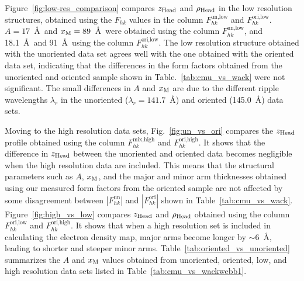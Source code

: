 Figure~\ref{fig:low-res_comparison} compares $z_\text{Head}$ and $\rho_\text{Head}$ in the low resolution structures, 
obtained using the $F_{hk}$ values in the column $F_{hk}^\text{un,low}$ and $F_{hk}^\text{ori,low}$.
$A=17$~\AA\ and $x_\textrm{M}=89$~\AA\ were obtained using the column $F_{hk}^\text{un,low}$, 
and 18.1~\AA\ and 91~\AA\ using the column $F_{hk}^\text{ori,low}$.
The low resolution structure obtained with the unoriented data set agrees well with 
the one obtained with the oriented data set, indicating that the differences in the form factors obtained
from the unoriented and oriented sample shown in Table.~\ref{tab:cmu_vs_wack} were not significant.
The small differences in $A$ and $x_\textrm{M}$ are due to the different
ripple wavelengths $\lambda_r$ in the unoriented ($\lambda_r=141.7$~\AA) and 
oriented (145.0~\AA) data sets. 

Moving to the high resolution data sets, 
Fig.~\ref{fig:un_vs_ori} compares the $z_\text{Head}$ profile obtained using the
column $F_{hk}^\text{mix,high}$ and $F_{hk}^\text{ori,high}$. 
It shows that the difference in $z_\text{Head}$ between the unoriented
and oriented data becomes negligible when the high resolution data are included.
This means that the structural parameters such as $A$, $x_\textrm{M}$, and the major and
minor arm thicknesses obtained using our measured form factors from the
oriented sample are not affected by some disagreement between $|F_{hk}^\text{un}|$
and $|F_{hk}^\text{ori}|$ shown in Table~\ref{tab:cmu_vs_wack}.
Figure~\ref{fig:high_vs_low} compares $z_\text{Head}$ and $\rho_\text{Head}$ obtained using 
the column $F_{hk}^\text{ori,low}$ and $F_{hk}^\text{ori,high}$. 
It shows that when a high resolution set is included
in calculating the electron density map, major arms become longer by 
$\sim$6~\AA, leading to shorter and steeper minor arms.
Table~\ref{tab:oriented_vs_unoriented} summarizes the $A$ and $x_\textrm{M}$ values
obtained from unoriented, oriented, low, and high resolution data sets
listed in Table~\ref{tab:cmu_vs_wackwebb1}.



